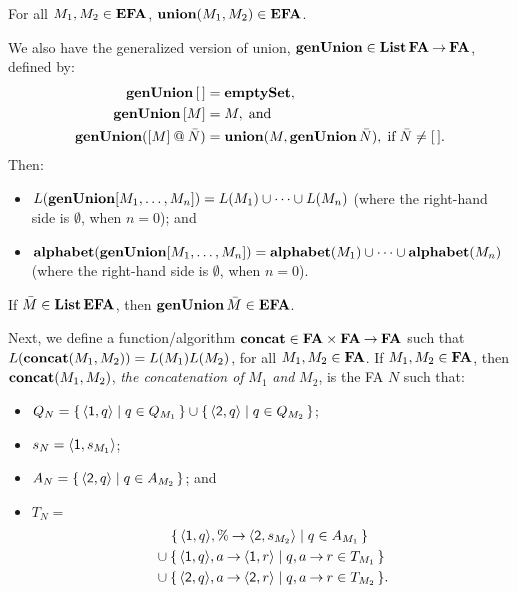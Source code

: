 \begin{proposition}
For all $M_1,M_2\in\mathbf{EFA}$, $\mathbf{union}(M_1,M_2)\in\mathbf{EFA}$.
\end{proposition}

We also have the generalized version of union, $\mathbf{genUnion}\in\mathbf{List}\,\mathbf{FA}\mathbin{\to}\mathbf{FA}$,
defined by:
\begin{align*}
\mathbf{genUnion}\,[\,] &= \mathbf{emptySet} , \\
\mathbf{genUnion}\,[M] &= M , \;\allowbreak\mbox{and}\allowbreak\; \\
\mathbf{genUnion}([M] \mathbin{@} \bar{N}) &=
\mathbf{union}(M, \mathbf{genUnion}\,\bar{N}) , \;\allowbreak\mbox{if}\allowbreak\; \bar{N}\neq [\,] .
\end{align*}
Then:
\begin{itemize}
\item $L(\mathbf{genUnion} [M_1,\ldots,M_n]) = L(M_1)\cup\cdots\cup L(M_n)$
  (where the right-hand side is $\emptyset$, when $n = 0$); and
\item
  $\mathbf{alphabet}(\mathbf{genUnion} [M_1,\ldots,M_n]) =
  \mathbf{alphabet}(M_1)\cup\cdots\cup \mathbf{alphabet}(M_n)$ (where the right-hand
  side is $\emptyset$, when $n = 0$).
\end{itemize}
If $\bar{M}\in\mathbf{List}\,\mathbf{EFA}$, then $\mathbf{genUnion}\,\bar{M}\in\mathbf{EFA}$.

%
%
%
%
Next, we define a function/algorithm $\mathbf{concat}\in\mathbf{FA}\times\mathbf{FA}\mathbin{\to}\mathbf{FA}$
such that $L(\mathbf{concat}(M_1,M_2))=L(M_1)L(M_2)$, for all
$M_1,M_2\in\mathbf{FA}$.  If $M_1,M_2\in\mathbf{FA}$, then $\mathbf{concat}(M_1,M_2)$, \emph{the
concatenation of} $M_1$ \emph{and} $M_2$, is the
FA $N$ such that:
\begin{itemize}
\item $Q_N=\{ \, \langle\mathsf{1},q\rangle \mid q\in Q_{M_1} \, \}\cup
\{ \, \langle\mathsf{2},q\rangle \mid q\in Q_{M_2} \, \}$;

\item $s_N=\langle\mathsf{1},s_{M_1}\rangle$;

\item $A_N=\{ \, \langle\mathsf{2},q\rangle \mid q\in
A_{M_2} \, \}$; and

\item $T_N={}$
  \begin{align*}
    &\quad\,
    \{ \, \langle\mathsf{1},q\rangle,\%\mathbin{\to}\langle\mathsf{2},s_{M_2}\rangle \mid q\in
      A_{M_1} \, \}
    \\
    &\cup
    \{ \, \langle\mathsf{1},q\rangle,a\mathbin{\to}\langle\mathsf{1},r\rangle \mid q,
      a\mathbin{\to} r\in T_{M_1} \, \}
    \\
    &\cup
    \{ \, \langle\mathsf{2},q\rangle,a\mathbin{\to}\langle\mathsf{2},r\rangle \mid q,
      a\mathbin{\to} r\in T_{M_2} \, \}.
  \end{align*}
\end{itemize}

